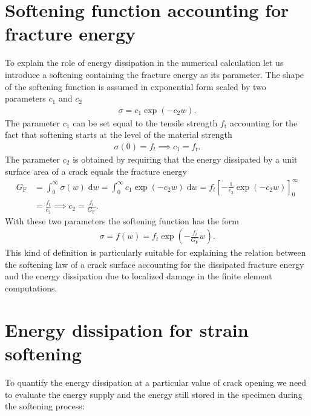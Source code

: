 \documentclass[main.tex]{subfiles}
\begin{document}
\section{Softening function accounting for fracture energy}

To explain the role of energy dissipation in the numerical calculation let us introduce
a softening containing the fracture energy as its parameter. The shape of the softening function
is assumed in exponential form scaled by two parameters $c_1$ and $c_2$
\begin{align}
\sigma = c_1 \exp( -c_2 w ).
\end{align}
The parameter $c_1$ can be set equal to the tensile strength $f_\mathrm{t}$ 
accounting for the fact that softening starts 
at the level of the material strength 
\begin{align}
\sigma(0) = f_t \implies  c_1 = f_t.
\end{align}
The parameter $c_2$ is obtained by requiring that the energy dissipated 
by a unit surface area of a crack equals 
the fracture energy
\begin{align}
G_\mathrm{F} & = \int_0^\infty \sigma(w) \; \mathrm{d}w
=
\int_0^\infty c_1 \exp( -c_2 w ) \; \mathrm{d} w 
= 
f_t \left[  -\frac{1}{c_2} \exp(-c_2 w) \right]_0^\infty \nonumber \\
& = 
\frac{f_t}{c_2}
\implies
c_2 = \frac{f_t}{G_\mathrm{F}}.
\end{align}
With these two parameters the softening function has the form
\begin{align}
\label{eq:fracture_based_cohesive_law}
\sigma = f(w) = f_t \exp\left( - \frac{f_t}{G_\mathrm{F}} w \right).
\end{align}
This kind of definition is particularly suitable for explaining the 
relation between the softening law of a crack surface accounting for the
dissipated fracture energy and the energy dissipation due to 
localized damage in the finite element computations.  

\section{Energy dissipation for strain softening}
To quantify the energy dissipation at a particular value of crack opening  we need to evaluate the energy supply and the energy still stored in the specimen during the softening process:
\end{document}

